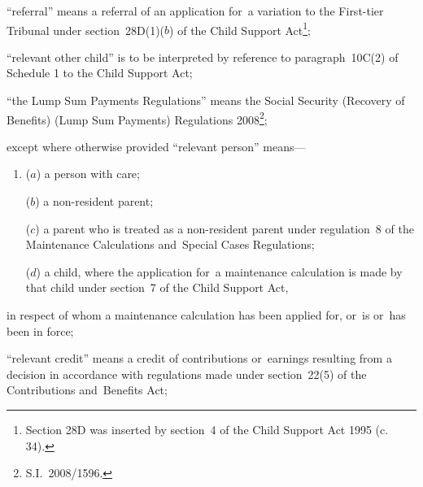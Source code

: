 \documentclass[12pt,a4paper]{article}
\begin{document}
\begin{enumerate}

“referral” means a referral of an application for~a 
variation  %
to 
the First-tier Tribunal  %
under section~28D(1)($b$) of the Child Support Act\footnote{\frenchspacing Section 28D was inserted by section~4 of the Child Support Act 1995 (c. 34).};

\begin{sloppypar}
“relevant other child” is to be interpreted by reference to paragraph~10C(2) of Schedule 1 to the Child Support Act;
\end{sloppypar}

“the Lump Sum Payments Regulations” means the Social Security (Recovery of Benefits) (Lump Sum Payments) Regulations 2008\footnote{S.I.~2008/1596.};

except where otherwise provided “relevant person” means—
\begin{enumerate}\item[]
    ($a$) 
    a person with care;

    ($b$) 
    a non-resident parent;

    ($c$) 
    a parent who is treated as a non-resident parent under regulation~8 of the Maintenance Calculations and~Special Cases Regulations;

    ($d$) 
    a child, where the application for~a maintenance calculation is made by that child under section~7 of the Child Support Act,
\end{enumerate}
    in respect of whom a maintenance calculation has been applied for, 
or~is or~has been in force;

“relevant credit” means a credit of contributions or~earnings resulting from a decision in accordance with regulations made under section~22(5) of the Contributions and~Benefits Act;


\end{enumerate}
\end{document}
